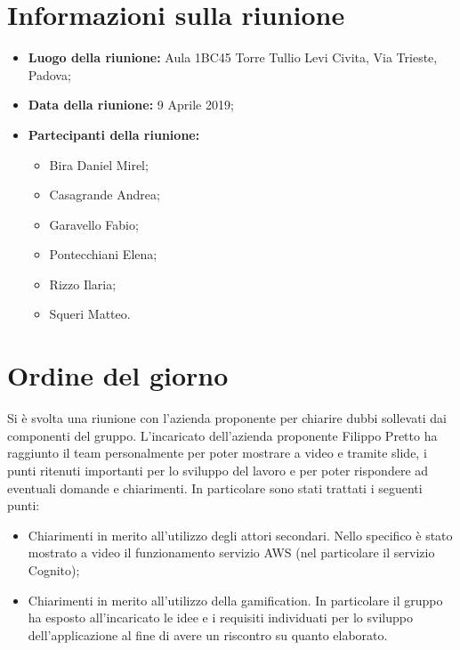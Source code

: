 \documentclass[a4paper, oneside, openany, dvipsnames, table]{article}
\begin{document}
\section{Informazioni sulla riunione}
\begin{itemize}
	\item \textbf{Luogo della riunione:} Aula 1BC45 Torre Tullio Levi Civita, Via Trieste, Padova;
	\item \textbf{Data della riunione:} 9 Aprile 2019;
	
	\item \textbf{Partecipanti della riunione:}
		\begin{itemize}
			\item Bira Daniel Mirel;
			\item Casagrande Andrea;
			\item Garavello Fabio;
			\item Pontecchiani Elena;
			\item Rizzo Ilaria;
			\item Squeri Matteo.
		\end{itemize}
\end{itemize}


	
	
	
\newpage
\section{Ordine del giorno}
Si è svolta una riunione con l'azienda proponente per chiarire dubbi sollevati dai componenti del gruppo. L'incaricato dell'azienda proponente Filippo Pretto ha raggiunto il team personalmente per poter mostrare a video e tramite slide, i punti ritenuti importanti per lo sviluppo del lavoro e per poter rispondere ad eventuali domande e chiarimenti.
In particolare sono stati trattati i seguenti punti:
\begin{itemize}
	\item Chiarimenti in merito all'utilizzo degli attori secondari. Nello specifico è stato mostrato a video il funzionamento servizio AWS (nel particolare il servizio Cognito);
	\item Chiarimenti in merito all'utilizzo della gamification. In particolare il gruppo ha esposto all'incaricato le idee e i requisiti individuati per lo sviluppo dell'applicazione al fine di avere un riscontro su quanto elaborato.
	 
		
\end{itemize}
	

\newpage
\end{document}
